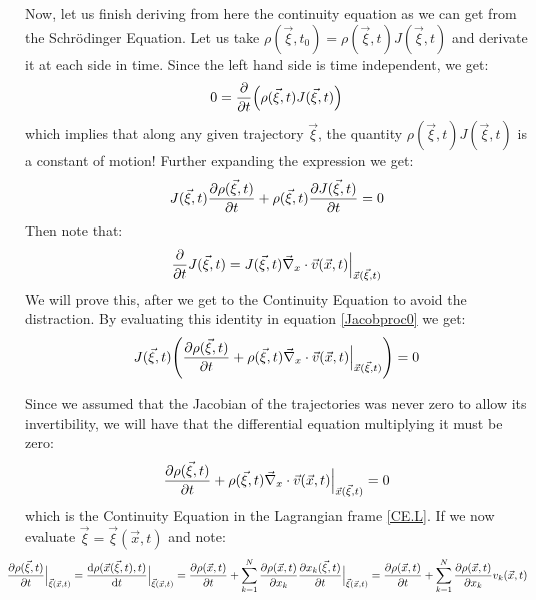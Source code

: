 \documentclass[11pt, a4paper]{article} %
\begin{document}
{Now, let us finish deriving from here the continuity equation as we can get from the Schrödinger Equation. Let us take $\rho(\vec{\xi},t_0) = \rho(\vec{\xi},t) J(\vec{\xi},t)$ and derivate it at each side in time. Since the left hand side is time independent, we get:
\begin{equation}
0=\pdv{}{t}\qty( \rho(\vec{\xi},t) J(\vec{\xi},t))
\end{equation}
which implies that along any given trajectory $\vec{\xi}$, the quantity $\rho(\vec{\xi},t) J(\vec{\xi},t)$ is a constant of motion! Further expanding the expression we get:
\begin{equation}\label{Jacobproc0}
J(\vec{\xi},t)\pdv{\rho(\vec{\xi},t)}{t}+\rho(\vec{\xi},t)\pdv{J(\vec{\xi},t)}{t}=0
\end{equation}
Then note that:
\begin{equation}\label{jainkoa}
\pdv{}{t}J(\vec{\xi},t)=J(\vec{\xi},t)\vec{\nabla}_x\cdot\vec{v}(\vec{x},t)\Big\rvert_{\vec{x}(\vec{\xi},t)}
\end{equation}
We will prove this, after we get to the Continuity Equation to avoid the distraction. By evaluating this identity in  equation \eqref{Jacobproc0} we get:
\begin{equation}
J(\vec{\xi},t)\qty(\pdv{\rho(\vec{\xi},t)}{t}+\rho(\vec{\xi},t)\vec{\nabla}_x\cdot\vec{v}(\vec{x},t)\Big\rvert_{\vec{x}(\vec{\xi},t)})=0
\end{equation}

Since we assumed that the Jacobian of the trajectories was never zero to allow its invertibility, we will have that the differential equation multiplying it must be zero:
\begin{equation}
\pdv{\rho(\vec{\xi},t)}{t}+\rho(\vec{\xi},t)\vec{\nabla}_x\cdot\vec{v}(\vec{x},t)\Big\rvert_{\vec{x}(\vec{\xi},t)}=0
\end{equation}
which is the Continuity Equation in the Lagrangian frame \eqref{CE.L}. If we now evaluate $\vec{\xi}=\vec{\xi}(\vec{x},t)$ and note:
\begin{equation}
\hspace*{-0.6cm}\pdv{\rho(\vec{\xi},t)}{t}\Big\rvert_{\vec{\xi}(\vec{x},t)}=\dv{\rho(\vec{x}(\vec{\xi},t),t)}{t}\Big\rvert_{\vec{\xi}(\vec{x},t)}=\pdv{\rho(\vec{x},t)}{t}+\sum_{k=1}^N\pdv{\rho(\vec{x},t)}{x_k}\pdv{x_k(\vec{\xi},t)}{t}\Big\rvert_{\vec{\xi}(\vec{x},t)}=\pdv{\rho(\vec{x},t)}{t}+\sum_{k=1}^N\pdv{\rho(\vec{x},t)}{x_k}v_k(\vec{x},t)
\end{equation}
}
\end{document}
